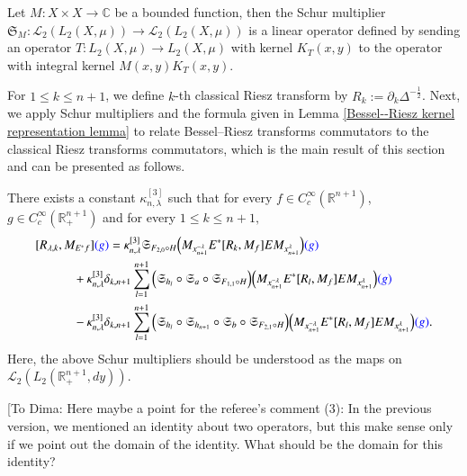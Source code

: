 \documentclass[12pt]{amsart}
\begin{document}
\begin{definition}
Let $M:X\times X\rightarrow \mathbb{C}$ be a bounded function, then the Schur multiplier $\mathfrak{S}_M: \mathcal{L}_2(L_2(X,\mu))\rightarrow \mathcal{L}_2(L_2(X,\mu))$ is a linear operator defined by sending an operator $T:L_2(X,\mu)\rightarrow L_2(X,\mu)$ with kernel $K_T(x,y)$ to the operator with integral kernel $M(x,y)K_T(x,y).$
\end{definition}
For $1\leq k\leq n+1$, we define $k$-th classical Riesz transform by $R_k:=\partial_k\Delta^{-\frac12}$.
Next, we apply Schur multipliers and the formula given in Lemma \ref{Bessel--Riesz kernel representation lemma} to relate Bessel--Riesz transforms commutators to the classical Riesz transforms commutators, which is the main result of this section and can be presented as follows.
\begin{proposition}\label{commutator representation lemma} There exists a constant $\kappa_{n,\lambda}^{[3]}$ such that for every $f\in C^{\infty}_c(\mathbb{R}^{n+1})$, {\color{blue}$g\in C_c^\infty(\mathbb{R}_+^{n+1})$} and for every $1\leq k\leq n+1,$
\begin{align}\label{RHSofxxx}
[R_{\lambda,k},M_{E^{\ast}f}]{\color{blue}(g)}&=\kappa_{n,\lambda}^{[3]}\mathfrak{S}_{F_{2,0}\circ H}\Big( M_{x_{n+1}^{-\lambda}} E^{\ast}[R_k,M_{f}]E M_{x_{n+1}^{\lambda}}\Big){\color{blue}(g)}\nonumber\\
&\hspace{-1.0cm}+\kappa_{n,\lambda}^{[3]}\delta_{k,n+1}\sum_{l=1}^{n+1}\Big(\mathfrak{S}_{h_l}\circ\mathfrak{S}_a\circ\mathfrak{S}_{F_{1,1}\circ H}\Big)\Big(M_{x_{n+1}^{-\lambda}} E^{\ast}[R_l,M_{f}]E M_{x_{n+1}^{\lambda}}\Big){\color{blue}(g)}\nonumber\\
&\hspace{-1.0cm}-\kappa_{n,\lambda}^{[3]}\delta_{k,n+1}\sum_{l=1}^{n+1}\Big(\mathfrak{S}_{h_l}\circ\mathfrak{S}_{h_{n+1}}\circ\mathfrak{S}_b\circ\mathfrak{S}_{F_{2,1}\circ H}\Big)\Big( M_{x_{n+1}^{-\lambda}} E^{\ast}[R_l,M_{f}]E M_{x_{n+1}^{\lambda}}\Big){\color{blue}(g)}.
\end{align}
{\color{red}Here, the above Schur multipliers should be understood as the maps on $\mathcal{L}_2(L_2(\mathbb{R}_+^{n+1},dy))$.}

{\color{red}[To Dima: Here maybe a point for the referee's comment (3): In the previous version, we mentioned an identity about two operators, but this make sense only if we point out the domain of the identity. What should be the domain for this identity?

}
\end{proposition}
\end{document}

